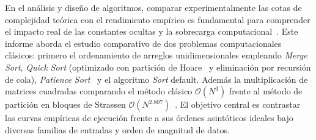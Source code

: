 En el análisis y diseño de algoritmos, comparar experimentalmente las cotas de complejidad teórica con el
 rendimiento empírico es fundamental para comprender el impacto real de las constantes ocultas y la sobrecarga 
 computacional~\cite{cormen2009,hales2017replicability}. Este informe aborda el estudio comparativo de dos problemas
  computacionales clásicos: primero el ordenamiento de arreglos unidimensionales empleando
   \textit{Merge Sort}, \textit{Quick Sort} (optimizado con partición de Hoare~\cite{educative_hoare_lomuto} 
   y eliminación por recursión de cola), \textit{Patience Sort}~\cite{taocv3,stablesort2019lis} y el 
   algoritmo \textit{Sort} default. 
   Además la multiplicación de matrices cuadradas comparando el método clásico $\mathcal{O}(N^3)$ frente al 
   método de partición en bloques de Strassen $\mathcal{O}(N^{2.807})$~\cite{cormen2009,bytequest2023strassen}. 
   El objetivo central es contrastar las curvas empíricas de ejecución frente a sus órdenes asintóticos ideales 
   bajo diversas familias de entradas y orden de magnitud de datos.
